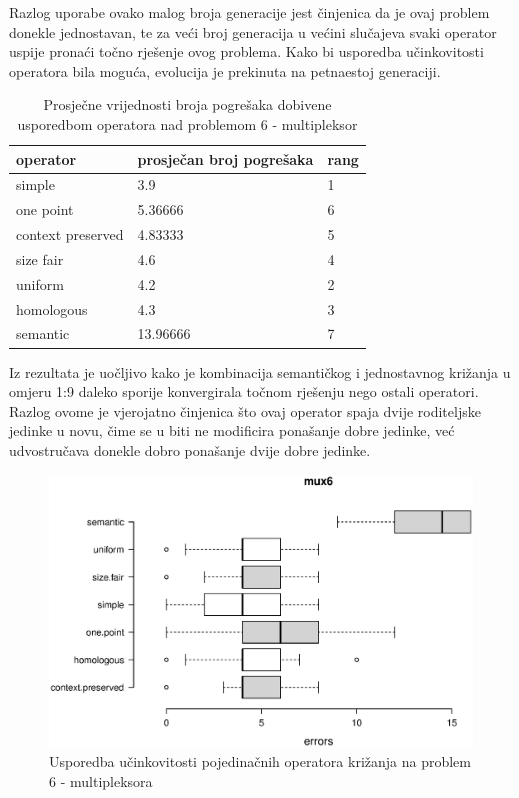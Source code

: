 Razlog uporabe ovako malog broja generacije jest činjenica da je ovaj problem donekle jednostavan, te za veći broj generacija u većini slučajeva svaki operator uspije pronaći točno rješenje ovog problema. Kako bi usporedba učinkovitosti operatora bila moguća, evolucija je prekinuta na petnaestoj generaciji.

\begin{table}[H]
 	\centering

    \begin{tabular}{| l | l | l |}
    \hline
    \textbf{operator}  & \textbf{prosječan broj pogrešaka} & \textbf{rang}\\ \hline
    simple & 3.9 & 1\\ \hline
    one point & 5.36666 & 6\\ \hline
    context preserved & 4.83333 & 5\\ \hline
    size fair & 4.6 & 4\\ \hline
    uniform & 4.2 & 2\\ \hline
    homologous & 4.3 & 3\\ \hline
    semantic & 13.96666 & 7\\ \hline
    \end{tabular}
    
    \caption{Prosječne vrijednosti broja pogrešaka dobivene usporedbom operatora nad problemom 6 - multipleksor}
    \label{mux6table}
\end{table}

Iz rezultata je uočljivo kako je kombinacija semantičkog i jednostavnog križanja u omjeru 1:9 daleko sporije konvergirala točnom rješenju nego ostali operatori. Razlog ovome je vjerojatno činjenica što ovaj operator spaja dvije roditeljske jedinke u novu, čime se u biti ne modificira ponašanje dobre jedinke, već udvostručava donekle dobro ponašanje dvije dobre jedinke.

\begin{figure}[H]
	\centering
	\includegraphics[trim=0cm 4cm 0cm 0cm, scale=0.6]{./slike/boxPlots/mux6.eps}
	\caption{Usporedba učinkovitosti pojedinačnih operatora križanja na problem 6 - multipleksora}
	\label{muxbox}
\end{figure}

